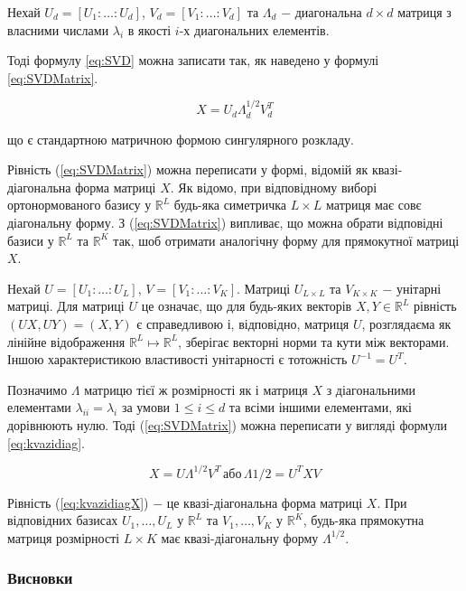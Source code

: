 Нехай $U_{d} = \left[ U_{1} : \dots : U_{d} \right]$, $V_{d} = \left[ V_{1} : \dots : V_{d}\right]$ та $\Lambda_{d}$ $-$ диагональна $d \times d$ матриця з власними числами $\lambda_{i}$ в якості $i$-х диагональних елементів.

Тоді формулу \ref{eq:SVD} можна записати так, як наведено у формулі \ref{eq:SVDMatrix}.

\begin{equation}\label{eq:SVDMatrix}
X = U_{d}\Lambda_{d}^{1/2}V_{d}^{T}
\end{equation}

\noindent що є стандартною матричною формою сингулярного розкладу.

Рівність (\ref{eq:SVDMatrix}) можна переписати у формі, відомій як квазі-діагональна форма матриці $X$. Як відомо, при відповідному виборі ортонормованого базису у $\mathds{R}^{L}$ будь-яка симетричка $L \times L$ матриця має совє діагональну форму. З (\ref{eq:SVDMatrix}) випливає, що можна обрати відповідні базиси у $\mathds{R}^{L}$ та $\mathds{R}^{K}$ так, шоб отримати аналогічну форму для прямокутної матриці $X$.

Нехай $U = [U_{1}: \dots : U_{L}]$, $V = [V_{1}: \dots : V_{K}]$. Матриці $U_{L \times L}$ та $V_{K \times K}$ $-$ унітарні матриці. Для матриці $U$ це означає, що для будь-яких векторів $X,Y \in \mathds{R}^{L}$ рівність $(UX, UY) = (X, Y)$ є справедливою і, відповідно, матриця $U$, розглядаєма як лінійне відображення $\mathds{R}^{L} \mapsto \mathds{R}^{L}$, зберігає векторні норми та кути між векторами. Іншою характеристикою властивості унітарності є тотожність $U^{-1}=U^{T}$.

Позначимо $\Lambda$ матрицю тієї ж розмірності як і матриця $X$ з діагональними елементами $\lambda_{ii} = \lambda_{i}$ за умови $1 \le i \le d$ та всіми іншими елементами, які дорівнюють нулю. Тоді (\ref{eq:SVDMatrix}) можна переписати у вигляді формули \ref{eq:kvazidiag}.

\begin{equation}\label{eq:kvazidiagX}
X = U\Lambda^{1/2}V^{T} \, \text{або} \, \Lambda{1/2}=U^{T}XV
\end{equation}

Рівність (\ref{eq:kvazidiagX}) $-$ це квазі-діагональна форма матриці $X$. При відповідних базисах $U_{1}, \dots, U_{L}$ у $\mathds{R}^{L}$ та $V_{1}, \dots, V_{K}$ у $\mathds{R}^{K}$, будь-яка прямокутна матриця розмірності $L \times K$ має квазі-діагональну форму $\Lambda^{1/2}$.

\subsubsection{Висновки}

